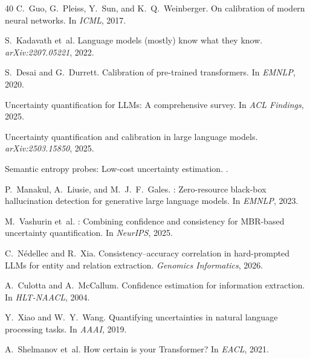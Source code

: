 \documentclass[11pt,a4paper]{article}
\begin{document}
\begin{thebibliography}{40}
C.~Guo, G.~Pleiss, Y.~Sun, and K.~Q.~Weinberger.
\newblock On calibration of modern neural networks.
\newblock In \emph{ICML}, 2017.

S.~Kadavath et~al.
\newblock Language models (mostly) know what they know.
\newblock \emph{arXiv:2207.05221}, 2022.

S.~Desai and G.~Durrett.
\newblock Calibration of pre-trained transformers.
\newblock In \emph{EMNLP}, 2020.

Uncertainty quantification for {LLMs}: A comprehensive survey.
\newblock In \emph{ACL Findings}, 2025.

Uncertainty quantification and calibration in large language models.
\newblock \emph{arXiv:2503.15850}, 2025.

Semantic entropy probes: Low-cost uncertainty estimation.
.

P.~Manakul, A.~Liusie, and M.~J.~F.~Gales.
: Zero-resource black-box hallucination detection for generative large language models.
\newblock In \emph{EMNLP}, 2023.

M.~Vashurin et~al.
: Combining confidence and consistency for {MBR}-based uncertainty quantification.
\newblock In \emph{NeurIPS}, 2025.

C.~N\'{e}dellec and R.~Xia.
\newblock Consistency--accuracy correlation in hard-prompted {LLMs} for entity and relation extraction.
\newblock \emph{Genomics Informatics}, 2026.

A.~Culotta and A.~McCallum.
\newblock Confidence estimation for information extraction.
\newblock In \emph{HLT-NAACL}, 2004.

Y.~Xiao and W.~Y.~Wang.
\newblock Quantifying uncertainties in natural language processing tasks.
\newblock In \emph{AAAI}, 2019.

A.~Shelmanov et~al.
\newblock How certain is your {Transformer}?
\newblock In \emph{EACL}, 2021.


\end{thebibliography}
\end{document}
